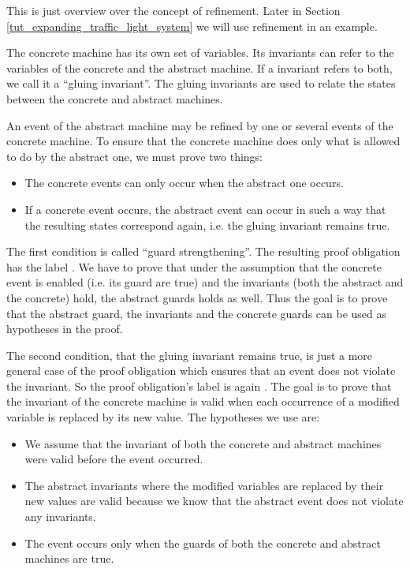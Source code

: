 This is just overview over the concept of refinement. Later in Section \ref{tut_expanding_traffic_light_system}
we will use refinement in an example.

The concrete machine has its own set of variables. Its invariants can refer to
the variables of the concrete and the abstract machine. If a invariant refers to both,
we call it a ``gluing invariant''. The gluing invariants are
used to relate the states between the concrete and abstract machines.

An event of the abstract machine may be refined by one or several events of the concrete machine.
To ensure that the concrete machine does only what is allowed to do by the abstract one, we must prove two things:
\begin{itemize}
\item The concrete events can only occur when the abstract one occurs.
\item If a concrete event occurs, the abstract event can occur in such a way that the resulting
  states correspond again, i.e. the gluing invariant remains true.
\end{itemize}

The first condition is called ``guard strengthening''. The resulting proof obligation has the label
. We have to prove that under the assumption that the
concrete event is enabled (i.e. its guard are true) and the invariants (both the abstract and the concrete) 
hold, the abstract guards holds as well. Thus the goal is to prove that the abstract guard, the invariants and the
concrete guards can be used as hypotheses in the proof.

The second condition, that the gluing invariant remains true, is just a more general case of the proof obligation which ensures 
that an event does not violate the invariant. So the proof obligation's label is again 
.
The goal is to prove that the invariant of the concrete machine is valid when each occurrence of a modified variable is replaced by its new value.
The hypotheses we use are:
\begin{itemize}
\item We assume that the invariant of both the concrete and abstract machines were valid before the event occurred.
\item The abstract invariants where the modified variables are replaced by their new values are valid because we know that the abstract event does not violate any invariants.
\item The event occurs only when the guards of both the concrete and abstract machines are true.
\end{itemize}

